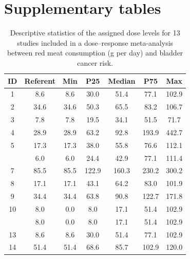 \documentclass[11pt,a4paper,twoside,openany]{book}\usepackage{knitr}
\begin{document}
{\begin{knitrout}
\end{knitrout}



\chapter{Supplementary tables}

\begin{knitrout}\footnotesize
{}\color{fgcolor}\begin{table}[!h]

\caption{\label{tab:chr_redtab}Descriptive statistics of the assigned dose levels for 13 studies 
      included in a dose--response meta-analysis between red meat consumption (g per day) and bladder
      cancer risk.}
\centering
\begin{tabular}[t]{ccccccc}
\toprule
ID & Referent & Min & P25 & Median & P75 & Max\\
\midrule
1 & 8.6 & 8.6 & 30.0 & 51.4 & 77.1 & 102.9\\
2 & 34.6 & 34.6 & 50.3 & 65.5 & 83.2 & 106.7\\
3 & 7.8 & 7.8 & 19.5 & 34.1 & 51.5 & 71.7\\
4 & 28.9 & 28.9 & 63.2 & 92.8 & 193.9 & 442.7\\
5 & 17.3 & 17.3 & 38.0 & 55.8 & 76.6 & 112.1\\
\addlinespace
6 & 6.0 & 6.0 & 24.4 & 42.9 & 77.1 & 111.4\\
7 & 85.5 & 85.5 & 122.9 & 160.3 & 230.2 & 300.2\\
8 & 17.1 & 17.1 & 43.1 & 64.2 & 83.0 & 101.9\\
9 & 34.4 & 34.4 & 63.8 & 90.8 & 122.7 & 171.8\\
10 & 8.0 & 0.0 & 8.0 & 17.1 & 51.4 & 102.9\\
\addlinespace
11 & 8.0 & 0.0 & 8.0 & 17.1 & 51.4 & 102.9\\
13 & 8.6 & 8.6 & 30.0 & 51.4 & 77.1 & 102.9\\
14 & 51.4 & 51.4 & 68.6 & 85.7 & 102.9 & 120.0\\
\bottomrule
\end{tabular}
\end{table}


\end{knitrout}


}
\end{document}
